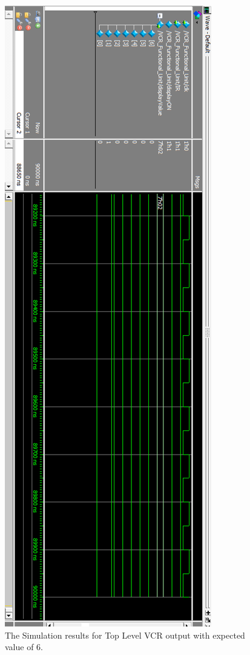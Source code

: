 \documentclass[a4paper]{article}
\begin{document}
\begin{figure}[t]
  \centering
  \includegraphics[height=.98\textheight]{sims/vcr_testing/functionalUnitTest/FunctionalUnitTest_6.png}
  \caption{The Simulation results for Top Level VCR output with expected value of 6.}
  \label{fig:top-level-block-1}
\end{figure}
\end{document}
